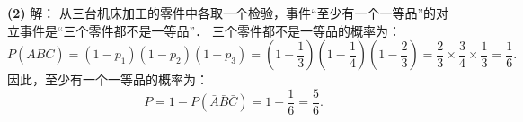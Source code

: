 \begin{answer}
\textbf{(2)} 解：
从三台机床加工的零件中各取一个检验，事件“至少有一个一等品”的对立事件是“三个零件都不是一等品”．
三个零件都不是一等品的概率为：
\nopagebreak[4]
\[
P(\bar{A}\bar{B}\bar{C}) = (1 - p_1)(1 - p_2)(1 - p_3) = \left(1 - \frac{1}{3}\right)\left(1 - \frac{1}{4}\right)\left(1 - \frac{2}{3}\right) = \frac{2}{3} \times \frac{3}{4} \times \frac{1}{3} = \frac{1}{6}.
\]
因此，至少有一个一等品的概率为：
\nopagebreak[4]
\[
P = 1 - P(\bar{A}\bar{B}\bar{C}) = 1 - \frac{1}{6} = \frac{5}{6}.
\]



\end{answer}
